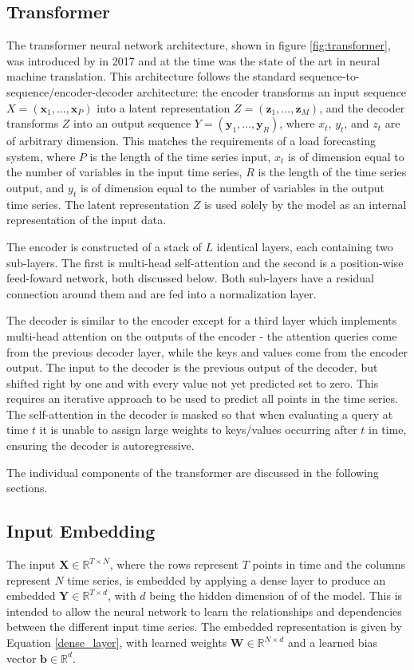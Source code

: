 \documentclass[conference]{IEEEtran}
\begin{document}
\subsection{Transformer}
The transformer neural network architecture, shown in figure \ref{fig:transformer}, was introduced by \cite{Vaswani2017} in 2017 and at the time was the state of the art in neural machine translation.
This architecture follows the standard sequence-to-sequence/encoder-decoder architecture: the encoder transforms an input sequence $X = (\boldsymbol{x}_1, ..., \boldsymbol{x}_P)$ into a latent representation $Z = (\boldsymbol{z}_1, ..., \boldsymbol{z}_M)$, and the decoder transforms $Z$ into an output sequence $Y = (\boldsymbol{y}_1, ..., \boldsymbol{y}_R)$, where $x_t$, $y_t$, and $z_t$ are of arbitrary dimension.
This matches the requirements of a load forecasting system, where $P$ is the length of the time series input, $x_t$ is of dimension equal to the number of variables in the input time series, $R$ is the length of the time series output, and $y_t$ is of dimension equal to the number of variables in the output time series.
The latent representation $Z$ is used solely by the model as an internal representation of the input data.

The encoder is constructed of a stack of $L$ identical layers, each containing two sub-layers.
The first is multi-head self-attention and the second is a position-wise feed-foward network, both discussed below.
Both sub-layers have a residual connection around them and are fed into a normalization layer.

The decoder is similar to the encoder except for a third layer which implements multi-head attention on the outputs of the encoder - the attention queries come from the previous decoder layer, while the keys and values come from the encoder output.
The input to the decoder is the previous output of the decoder, but shifted right by one and with every value not yet predicted set to zero.
This requires an iterative approach to be used to predict all points in the time series.
The self-attention in the decoder is masked so that when evaluating a query at time $t$ it is unable to assign large weights to keys/values occurring after $t$ in time, ensuring the decoder is autoregressive.

The individual components of the transformer are discussed in the following sections.

\subsection{Input Embedding}
The input $\boldsymbol{X} \in \mathbb{R}^{T \times N}$, where the rows represent $T$ points in time and the columns represent $N$ time series, is embedded by applying a dense layer to produce an embedded $\boldsymbol{Y} \in \mathbb{R}^{T \times d}$, with $d$ being the hidden dimension of of the model.
This is intended to allow the neural network to learn the relationships and dependencies between the different input time series.
The embedded representation is given by Equation \ref{dense_layer}, with learned weights $\boldsymbol{W} \in \mathbb{R}^{N \times d}$ and a learned bias vector $\boldsymbol{b} \in \mathbb{R}^{d}$.
\end{document}
